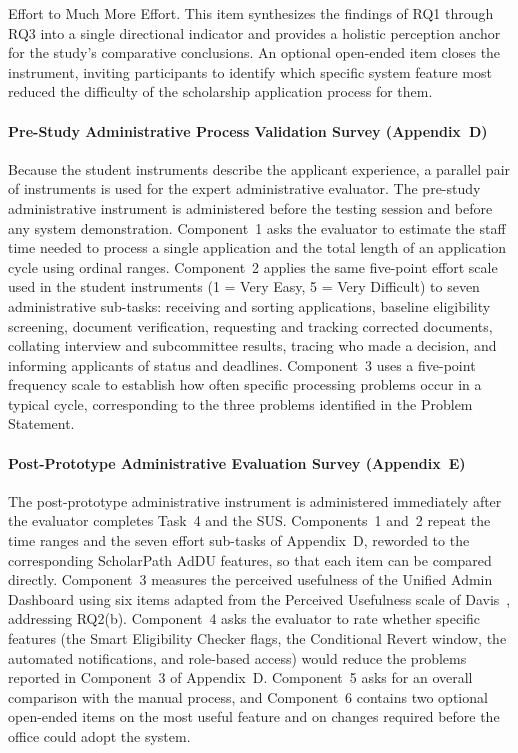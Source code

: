 Effort to Much More Effort. This item synthesizes the findings of RQ1 through RQ3 into a single directional indicator and provides a holistic perception anchor for the study's comparative conclusions. An optional open-ended item closes the instrument, inviting participants to identify which specific system feature most reduced the difficulty of the scholarship application process for them.

\paragraph{Pre-Study Administrative Process Validation Survey
(Appendix~D)} Because the student instruments describe the applicant
experience, a parallel pair of instruments is used for the expert
administrative evaluator. The pre-study administrative instrument is
administered before the testing session and before any system
demonstration. Component~1 asks the evaluator to estimate the staff time
needed to process a single application and the total length of an
application cycle using ordinal ranges. Component~2 applies the same
five-point effort scale used in the student instruments (1 = Very Easy,
5 = Very Difficult) to seven administrative sub-tasks: receiving and
sorting applications, baseline eligibility screening, document
verification, requesting and tracking corrected documents, collating
interview and subcommittee results, tracing who made a decision, and
informing applicants of status and deadlines. Component~3 uses a
five-point frequency scale to establish how often specific processing
problems occur in a typical cycle, corresponding to the three problems
identified in the Problem Statement.

\paragraph{Post-Prototype Administrative Evaluation Survey (Appendix~E)}
The post-prototype administrative instrument is administered immediately
after the evaluator completes Task~4 and the SUS. Components~1 and~2
repeat the time ranges and the seven effort sub-tasks of Appendix~D,
reworded to the corresponding ScholarPath AdDU features, so that each
item can be compared directly. Component~3 measures the perceived
usefulness of the Unified Admin Dashboard using six items adapted from
the Perceived Usefulness scale of Davis~\cite{ref51}, addressing
RQ2(b). Component~4 asks the evaluator to rate whether specific features
(the Smart Eligibility Checker flags, the Conditional Revert window, the
automated notifications, and role-based access) would reduce the
problems reported in Component~3 of Appendix~D. Component~5 asks for an
overall comparison with the manual process, and Component~6 contains two
optional open-ended items on the most useful feature and on changes
required before the office could adopt the system.

